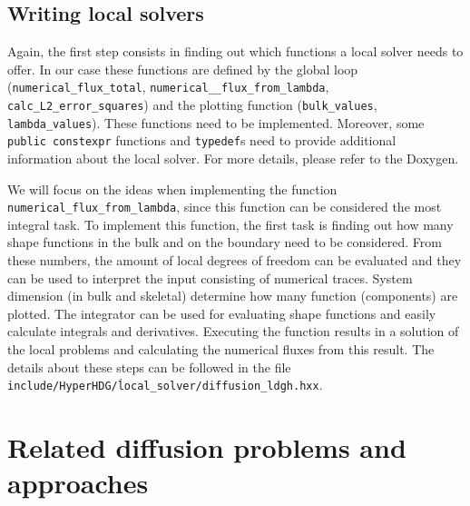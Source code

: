 \documentclass[a4paper, english, 12pt, reqno, draft]{amsart}
\theoremstyle{definition}
\theoremstyle{remark}
\numberwithin{equation}{section}
\newcommand{\code}[1]{\texttt{#1}}
\begin{document}
\subsection{Writing local solvers}
%
Again, the first step consists in finding out which functions a local solver needs to offer. In our case these functions are defined by the global loop (\code{numerical\_\-flux\_\-total}, \code{numerical\_\_flux\_\-from\_\-lambda}, \code{calc\_\-L2\_\-error\_\-squares}) and the plotting function (\code{bulk\_\-values}, \code{lambda\_\-values}). These functions need to be implemented. Moreover, some \code{public constexpr} functions and \code{typedef}s need to provide additional information about the local solver. For more details, please refer to the Doxygen.

We will focus on the ideas when implementing the function \code{numerical\_\-flux\_\-from\_\-lambda}, since this function can be considered the most integral task. To implement this function, the first task is finding out how many shape functions in the bulk and on the boundary need to be considered. From these numbers, the amount of local degrees of freedom can be evaluated and they can be used to interpret the input consisting of numerical traces. System dimension (in bulk and skeletal) determine how many function (components) are plotted. The integrator can be used for evaluating shape functions and easily calculate integrals and derivatives. Executing the function results in a solution of the local problems and calculating the numerical fluxes from this result. The details about these steps can be followed in the file \code{include/\-HyperHDG/\.local\_\-solver/diffusion\_\-ldgh.hxx}.
%
\section{Related diffusion problems and approaches}\label{SEC:related_diffusion_problems}
% 
\end{document}
